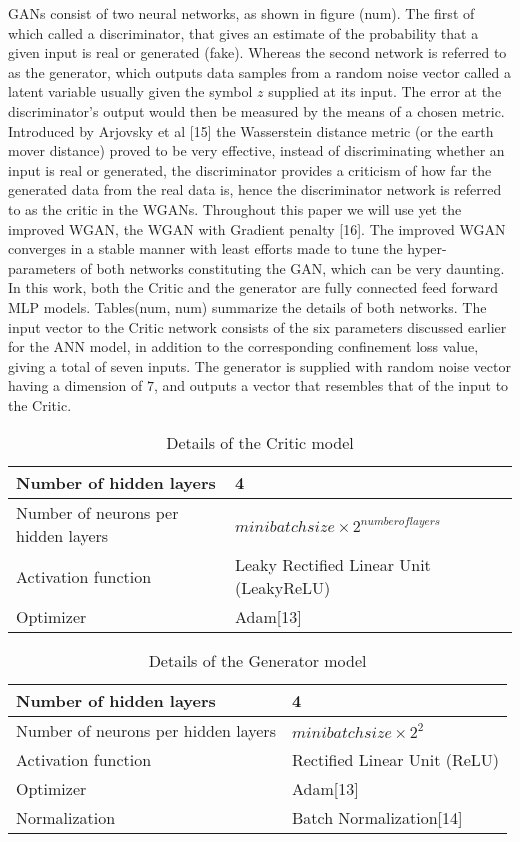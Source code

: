 \documentclass[draft, a4, 10pt, onecolumn]{IEEEtran}
\begin{document}
GANs consist of two neural networks, as shown in figure (num). The first of which called a discriminator, that gives an estimate of the probability that a given input is real or generated (fake). Whereas the second network is referred to as the generator, which outputs data samples from a random noise vector called a latent variable usually given the symbol $z$ supplied at its input. The error at the discriminator's output would then be measured by the means of a chosen metric. Introduced by Arjovsky et al [15] the Wasserstein distance metric (or the earth mover distance) proved to be very effective, instead of discriminating whether an input is real or generated, the discriminator provides a criticism of how far the generated data from the real data is, hence the discriminator network is referred to as the critic in the WGANs. Throughout this paper we will use yet the improved WGAN, the WGAN with Gradient penalty [16]. The improved WGAN converges in a stable manner with least efforts made to tune the hyper- parameters of both networks constituting the GAN, which can be very daunting.
In this work, both the Critic and the generator are fully connected feed forward MLP models. Tables(num, num) summarize the details of both networks. The input vector to the Critic network consists of the six parameters discussed earlier for the ANN model, in addition to the corresponding confinement loss value, giving a total of seven inputs. The generator is supplied with random noise vector having a dimension of $7$, and outputs a vector that resembles that of the input to the Critic.
\begin{table}[h]
\centering
\begin{tabular}{|l|l|}
\hline
Number of hidden layers & 4  \\
\hline
Number of neurons per hidden layers & $ minibatchsize\times2^{number of layers} $  \\
\hline
Activation function & Leaky Rectified Linear Unit (LeakyReLU)  \\
\hline
Optimizer & Adam[13]  \\
\hline
    \end{tabular}
\caption{Details of the Critic model}    
\end{table}

\begin{table}[h]
\centering
 \begin{tabular}{|l|l|}
    \hline
Number of hidden layers & 4  \\
\hline
Number of neurons per hidden layers & $ minibatchsize\times2^{2} $  \\
\hline
Activation function & Rectified Linear Unit (ReLU)  \\
\hline
Optimizer & Adam[13]  \\
\hline
Normalization & Batch Normalization[14] \\
\hline
    \end{tabular}
\caption{Details of the Generator model}
\end{table}
\end{document}
